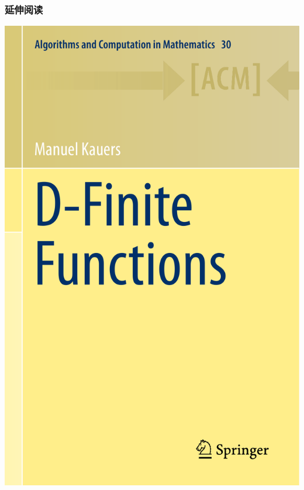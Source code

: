 \documentclass{ctexbeamer}
\begin{document}
\begin{frame}
  \frametitle{延伸阅读}

  \includegraphics[scale=0.2]{DFinite.pdf}

\end{frame}
\end{document}
